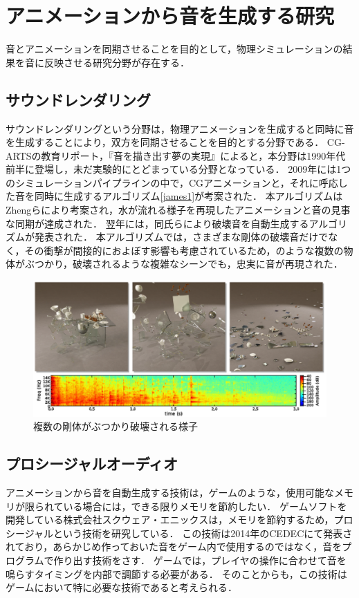 \section{アニメーションから音を生成する研究}\label{sec:generate_sound}
音とアニメーションを同期させることを目的として，物理シミュレーションの結果を音に反映させる研究分野が存在する．\\
%
\subsection{サウンドレンダリング}
サウンドレンダリングという分野は，物理アニメーションを生成すると同時に音を生成することにより，双方を同期させることを目的とする分野である．
CG-ARTSの教育リポート，『音を描き出す夢の実現』\cite{CG-ARTS}によると，本分野は1990年代前半に登場し，未だ実験的にとどまっている分野となっている．
2009年には1つのシミュレーションパイプラインの中で，CGアニメーションと，それに呼応した音を同時に生成するアルゴリズム\ref{james1}が考案された．
本アルゴリズムはZhengらにより考案され，水が流れる様子を再現したアニメーションと音の見事な同期が達成された．
%
翌年には，同氏らにより破壊音を自動生成するアルゴリズム\cite{james2}が発表された．
本アルゴリズムでは，さまざまな剛体の破壊音だけでなく，その衝撃が間接的におよぼす影響も考慮されているため，のような複数の物体がぶつかり，破壊されるような複雑なシーンでも，忠実に音が再現された．
\begin{figure}[h]
	\centering
	\includegraphics[width=14cm]{fig/chap2/james2.eps}
	\caption{複数の剛体がぶつかり破壊される様子}
	\label{fig:james2}
\end{figure}

\subsection{プロシージャルオーディオ}
アニメーションから音を自動生成する技術は，ゲームのような，使用可能なメモリが限られている場合には，できる限りメモリを節約したい．
ゲームソフトを開発している株式会社スクウェア・エニックスは，メモリを節約するため，プロシージャルという技術を研究している．
この技術は2014年のCEDEC\cite{SQUARE}にて発表されており，あらかじめ作っておいた音をゲーム内で使用するのではなく，音をプログラムで作り出す技術をさす．
ゲームでは，プレイヤの操作に合わせて音を鳴らすタイミングを内部で調節する必要がある．
そのことからも，この技術はゲームにおいて特に必要な技術であると考えられる．

